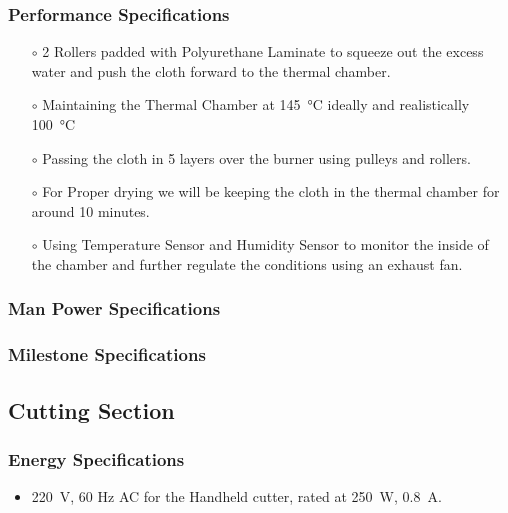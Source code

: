 \subsubsection{Performance Specifications}
\begin{itemize}
    \item[$\scriptstyle\circ$]	2 Rollers padded with Polyurethane Laminate to squeeze out the excess water and push the cloth forward to the thermal chamber.
    \item[$\scriptstyle\circ$] Maintaining the Thermal Chamber at \SI{145}{\degreeCelsius} ideally and realistically \SI{100}{\degreeCelsius}
    \item[$\scriptstyle\circ$] Passing the cloth in 5 layers over the burner using pulleys and rollers.
    \item[$\scriptstyle\circ$] For Proper drying we will be keeping the cloth in the thermal chamber for around 10 minutes.
    \item[$\scriptstyle\circ$] Using Temperature Sensor and Humidity Sensor to monitor the inside of the chamber and further regulate the conditions using an exhaust fan. \cite{dryden_chapter_1982} \cite{noauthor_drying_nodate} \cite{noauthor_dry_nodate}
\end{itemize}
\subsubsection{Man Power Specifications}

\subsubsection{Milestone Specifications}

\subsection{Cutting Section}
\subsubsection{Energy Specifications}
\begin{itemize}
    \item \SI{220}{\volt}, 60 Hz AC for the Handheld cutter, rated at \SI{250}{\watt}, \SI{0.8}{\ampere}.
\end{itemize}
